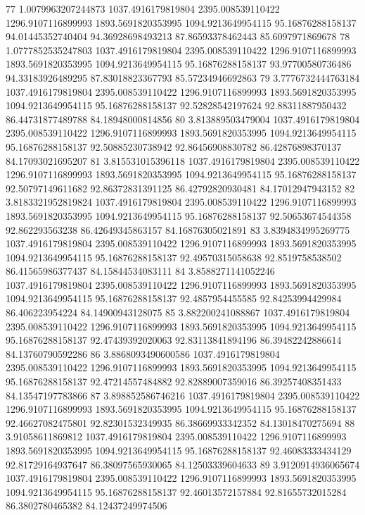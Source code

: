 {77 1.0079963207244873 1037.4916179819804 2395.008539110422 1296.9107116899993 1893.5691820353995 1094.9213649954115 95.16876288158137 94.01445352740404 94.36928698493213 87.86593378462443 85.6097971869678
78 1.0777852535247803 1037.4916179819804 2395.008539110422 1296.9107116899993 1893.5691820353995 1094.9213649954115 95.16876288158137 93.97700580736486 94.33183926489295 87.83018823367793 85.57234946692863
79 3.7776732444763184 1037.4916179819804 2395.008539110422 1296.9107116899993 1893.5691820353995 1094.9213649954115 95.16876288158137 92.52828542197624 92.88311887950432 86.44731877489788 84.18948000814856
80 3.813889503479004 1037.4916179819804 2395.008539110422 1296.9107116899993 1893.5691820353995 1094.9213649954115 95.16876288158137 92.50885230738942 92.86456908830782 86.42876898370137 84.17093021695207
81 3.815531015396118 1037.4916179819804 2395.008539110422 1296.9107116899993 1893.5691820353995 1094.9213649954115 95.16876288158137 92.50797149611682 92.86372831391125 86.42792820930481 84.17012947943152
82 3.8183321952819824 1037.4916179819804 2395.008539110422 1296.9107116899993 1893.5691820353995 1094.9213649954115 95.16876288158137 92.50653674544358 92.862293563238 86.42649345863157 84.16876305021891
83 3.8394834995269775 1037.4916179819804 2395.008539110422 1296.9107116899993 1893.5691820353995 1094.9213649954115 95.16876288158137 92.49570315058638 92.8519758538502 86.41565986377437 84.15844534083111
84 3.8588271141052246 1037.4916179819804 2395.008539110422 1296.9107116899993 1893.5691820353995 1094.9213649954115 95.16876288158137 92.4857954455585 92.84253994429984 86.406223954224 84.14900943128075
85 3.882200241088867 1037.4916179819804 2395.008539110422 1296.9107116899993 1893.5691820353995 1094.9213649954115 95.16876288158137 92.47439392020063 92.83113841894196 86.39482242886614 84.13760790592286
86 3.8868093490600586 1037.4916179819804 2395.008539110422 1296.9107116899993 1893.5691820353995 1094.9213649954115 95.16876288158137 92.47214557484882 92.82889007359016 86.39257408351433 84.13547197783866
87 3.898852586746216 1037.4916179819804 2395.008539110422 1296.9107116899993 1893.5691820353995 1094.9213649954115 95.16876288158137 92.46627082475801 92.82301532349935 86.38669933342352 84.13018470275694
88 3.91058611869812 1037.4916179819804 2395.008539110422 1296.9107116899993 1893.5691820353995 1094.9213649954115 95.16876288158137 92.46083333434129 92.81729164937647 86.38097565930065 84.12503339604633
89 3.9120914936065674 1037.4916179819804 2395.008539110422 1296.9107116899993 1893.5691820353995 1094.9213649954115 95.16876288158137 92.46013572157884 92.81655732015284 86.3802780465382 84.12437249974506
}
